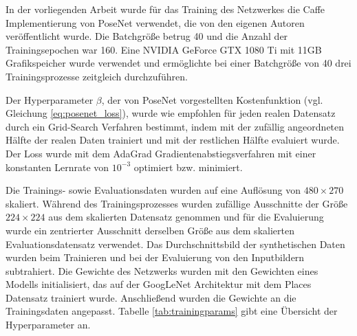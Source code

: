 

In der vorliegenden Arbeit wurde für das Training des Netzwerkes die Caffe \cite{jiaCaffeConvolutionalArchitecture2014} Implementierung von PoseNet verwendet, die von den eigenen Autoren \citet{kendallPoseNetConvolutionalNetwork2015} veröffentlicht wurde. Die Batchgröße betrug 40 und die Anzahl der Trainingsepochen war 160. Eine NVIDIA GeForce GTX 1080 Ti mit 11GB Grafikspeicher wurde verwendet und ermöglichte bei einer Batchgröße von 40 drei Trainingsprozesse zeitgleich durchzuführen.

Der Hyperparameter $\beta$, der von PoseNet vorgestellten Kostenfunktion (vgl. Gleichung \ref{eq:posenet_loss}), wurde wie empfohlen für jeden realen Datensatz durch ein Grid-Search Verfahren bestimmt, indem mit der zufällig angeordneten Hälfte der realen Daten trainiert und mit der restlichen Hälfte evaluiert wurde. Der Loss wurde mit dem AdaGrad \cite{duchiAdaptiveSubgradientMethods2011} Gradientenabstiegsverfahren mit einer konstanten Lernrate von $10^{-3}$ optimiert bzw. minimiert. 

Die Trainings- sowie Evaluationsdaten wurden auf eine Auflösung von $480\times270$ skaliert. Während des Trainingsprozesses wurden zufällige Ausschnitte der Größe $224 \times 224$ aus dem skalierten Datensatz genommen und für die Evaluierung wurde ein zentrierter Ausschnitt derselben Größe aus dem skalierten Evaluationsdatensatz verwendet. Das Durchschnittsbild der synthetischen Daten wurden beim Trainieren und bei der Evaluierung von den Inputbildern subtrahiert. 
Die Gewichte des Netzwerks wurden mit den Gewichten eines Modells initialisiert, das auf der GoogLeNet Architektur mit dem Places Datensatz trainiert wurde. Anschließend wurden die Gewichte an die Trainingsdaten angepasst. Tabelle \ref{tab:trainingparams} gibt eine Übersicht der Hyperparameter an.


